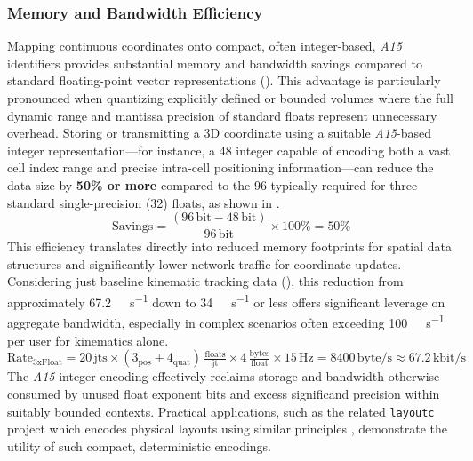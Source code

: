 \documentclass[10pt]{article}
\def\AAAB{\textit{A15}}
\begin{document}
\subsubsection{Memory and Bandwidth Efficiency}\label{subsubsec-benefits-efficiency}
Mapping continuous coordinates onto compact, often integer-based, \AAAB{} identifiers provides substantial memory and bandwidth savings compared to standard floating-point vector representations (). This advantage is particularly pronounced when quantizing explicitly defined or bounded volumes where the full dynamic range and mantissa precision of standard floats represent unnecessary overhead. Storing or transmitting a 3D coordinate using a suitable \AAAB{}-based integer representation—for instance, a \SI{48}{\bit} integer capable of encoding both a vast cell index range and precise intra-cell positioning information—can reduce the data size by \textbf{50\% or more} compared to the \SI{96}{\bit} typically required for three standard single-precision (\SI{32}{\bit}) floats, as shown in .
\begin{equation} \label{eq-efficiency-memory}
    \text{Savings} = \frac{(96\,\text{bit} - 48\,\text{bit})}{96\,\text{bit}} \times 100\% = 50\%
\end{equation}
This efficiency translates directly into reduced memory footprints for spatial data structures and significantly lower network traffic for coordinate updates. Considering just baseline kinematic tracking data (), this reduction from approximately \SI{67.2}{\kilo\bit\per\second} down to \SI{34}{\kilo\bit\per\second} or less offers significant leverage on aggregate bandwidth, especially in complex scenarios often exceeding \SI{100}{\kilo\bit\per\second} per user for kinematics alone.
\begin{equation} \label{eq-bandwidth-baseline}
    \text{Rate}_{\text{3xFloat}} = 20\,\text{jts} \times (3_{\text{pos}} + 4_{\text{quat}})\,\tfrac{\text{floats}}{\text{jt}} \times 4\,\tfrac{\text{bytes}}{\text{float}} \times 15\,\text{Hz} = 8400\,\text{byte/s} \approx 67.2\,\text{kbit/s}
\end{equation}
The \AAAB{} integer encoding effectively reclaims storage and bandwidth otherwise consumed by unused float exponent bits and excess significand precision within suitably bounded contexts. Practical applications, such as the related \texttt{layoutc} project which encodes physical layouts using similar principles \cite{Risinger2024Layoutc}, demonstrate the utility of such compact, deterministic encodings.
\end{document}
